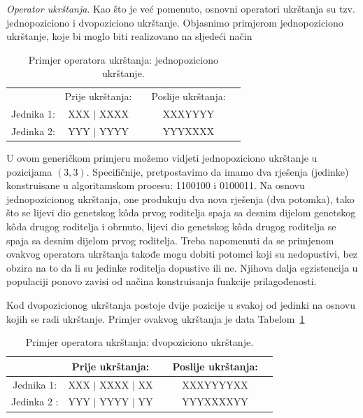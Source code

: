 \documentclass[b5paper, utf8, 11pt, colorlinks]{book}
\theoremstyle{definition}
\begin{document}
\emph{Operator ukrštanja}. Kao što je već pomenuto, osnovni operatori ukrštanja su tzv. jednopoziciono i dvopoziciono ukrštanje. Objasnimo primjerom jednopoziciono ukrštanje, koje bi moglo biti realizovano na sljedeći način
\begin{table}[H]
	\centering

\begin{tabular}{ccccc}
              &	Prije ukrštanja: &    &  Poslije ukrštanja:   \\
   Jednika 1: &	XXX $\mid$ XXXX  &    &   XXXYYYY             \\
   Jedinka 2:&	YYY $\mid$ YYYY  &    &   YYYXXXX             \\
\end{tabular}
	\caption{Primjer operatora ukrštanja: jednopoziciono ukrštanje.}
\end{table}
U ovom generičkom primjeru možemo vidjeti jednopoziciono ukrštanje u pozicijama $(3, 3).$  Specifičnije, pretpostavimo da imamo dva rješenja (jedinke) konstruisane u algoritamskom procesu: 1100100 i 0100011. Na osnovu jednopozicionog ukrštanja, one produkuju dva nova rješenja (dva potomka), tako što se lijevi dio genetskog k\^oda prvog roditelja spaja sa desnim dijelom genetskog k\^oda drugog roditelja i obrnuto, lijevi dio genetskog k\^oda drugog roditelja se spaja sa desnim dijelom prvog roditelja. 
Treba napomenuti da se primjenom ovakvog operatora ukrštanja takođe mogu dobiti potomci koji su nedopustivi, bez obzira na to da li su jedinke roditelja dopustive ili ne. Njihova dalja egzistencija u populaciji ponovo zavisi od načina konstruisanja funkcije prilagođenosti. 

Kod dvopozicionog ukrštanja postoje dvije pozicije u svakoj od jedinki na osnovu kojih se radi ukrštanje. Primjer ovakvog ukrštanja je data Tabelom~\ref{tbl:dvopozukr}
\begin{table}[H]
	\centering
	
	\begin{tabular}{ccccc}
		&	Prije ukrštanja: &    &  Poslije ukrštanja:                         \\\hline
		Jednika 1: &	XXX $\mid$ XXXX $\mid$ XX  &    &   XXXYYYYXX             \\
		Jedinka 2 :&	YYY $\mid$ YYYY $\mid$ YY  &    &   YYYXXXXYY             \\
	\end{tabular}
	\caption{Primjer operatora ukrštanja: dvopoziciono ukrštanje.}\label{tbl:dvopozukr}
\end{table}
\end{document}
